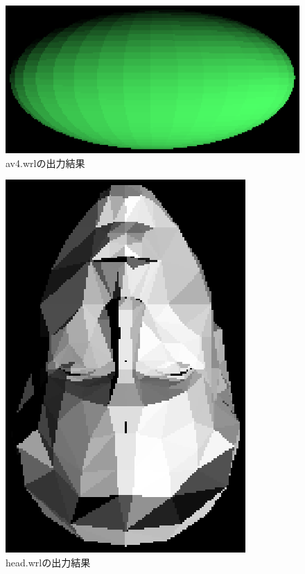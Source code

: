 \documentclass[a4j,dvipdfmx]{jsarticle}
\begin{document}
\begin{figure}[hp]
  \begin{center}
    \includegraphics[clip,scale=0.5]{images/Kadai02ForAv4.eps}
    \caption{av4.wrlの出力結果}
    \label{av4}
  \end{center}
\end{figure}

\begin{figure}[hp]
  \begin{center}
    \includegraphics[clip,scale=0.5]{images/Kadai02ForHead.eps}
    \caption{head.wrlの出力結果}
    \label{head}
  \end{center}
\end{figure}
\end{document}
